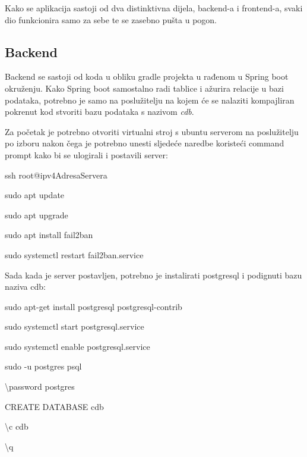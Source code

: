             {Kako se aplikacija sastoji od dva distinktivna dijela, backend-a i frontend-a, svaki dio funkcionira samo za sebe te se zasebno pušta u pogon.}

			\subsection{Backend}

                {Backend se sastoji od koda u obliku gradle projekta u rađenom u Spring boot okruženju. Kako Spring boot samostalno radi tablice i ažurira relacije u bazi podataka, potrebno je samo na poslužitelju na kojem će se nalaziti kompajliran pokrenut kod stvoriti bazu podataka s nazivom \textit{cdb}.}
                
                {Za početak je potrebno otvoriti virtualni stroj s ubuntu serverom na poslužitelju po izboru nakon čega je potrebno unesti sljedeće naredbe koristeći command prompt kako bi se ulogirali i postavili server:}

                \begin{packed_item}
        			\item {ssh root@ipv4AdresaServera}
        			\item {sudo apt update}
        			\item {sudo apt upgrade}
        			\item {sudo apt install fail2ban}
        			\item {sudo systemctl restart fail2ban.service}
        		\end{packed_item}

                {Sada kada je server postavljen, potrebno je instalirati postgresql i podignuti bazu naziva cdb:}

                \begin{packed_item}
        			\item {sudo apt-get install postgresql postgresql-contrib}
        			\item {sudo systemctl start postgresql.service}
        			\item {sudo systemctl enable postgresql.service}
        			\item {sudo -u postgres psql}
        			\item {\textbackslash password postgres}
        			\item {CREATE DATABASE cdb}
        			\item {\textbackslash c cdb}
        			\item {\textbackslash q}
        		\end{packed_item}


